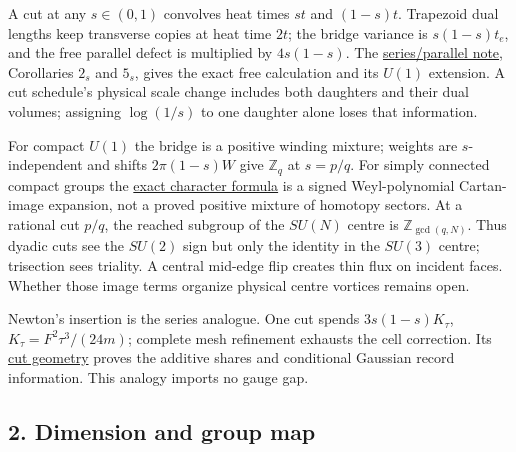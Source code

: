 \documentclass[11pt,a4paper]{article}
\begin{document}
A cut at any \(s\in(0,1)\) convolves heat times \(st\) and \((1-s)t\).
Trapezoid dual lengths keep transverse copies at heat time \(2t\); the
bridge variance is \(s(1-s)t_e\), and the free parallel defect is
multiplied by \(4s(1-s)\). The
\href{series-parallel-gauge-refinement.md}{series/parallel note},
Corollaries \(2_s\) and \(5_s\), gives the exact free calculation and
its \(U(1)\) extension. A cut schedule's physical scale change includes
both daughters and their dual volumes; assigning \(\log(1/s)\) to one
daughter alone loses that information.

For compact \(U(1)\) the bridge is a positive winding mixture; weights
are \(s\)-independent and shifts \(2\pi(1-s)W\) give \(\mathbb Z_q\) at
\(s=p/q\). For simply connected compact groups the
\href{sun-midpoint-centre.md}{exact character formula} is a signed
Weyl-polynomial Cartan-image expansion, not a proved positive mixture of
homotopy sectors. At a rational cut \(p/q\), the reached subgroup of the
\(SU(N)\) centre is \(\mathbb Z_{\gcd(q,N)}\). Thus dyadic cuts see the
\(SU(2)\) sign but only the identity in the \(SU(3)\) centre; trisection
sees triality. A central mid-edge flip creates thin flux on incident
faces. Whether those image terms organize physical centre vortices
remains open.

Newton's insertion is the series analogue. One cut spends
\(3s(1-s)K_\tau\), \(K_\tau=F^2\tau^3/(24m)\); complete mesh refinement
exhausts the cell correction. Its \href{cut-measure-newton.md}{cut
geometry} proves the additive shares and conditional Gaussian record
information. This analogy imports no gauge gap.

\hypertarget{dimension-and-group-map}{%
\subsection{2. Dimension and group map}\label{dimension-and-group-map}}
\end{document}
